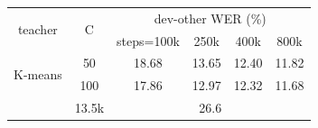 \begin{tabular}{cc|cccc}
    \toprule
    \multirow{2}{*}{teacher} & \multirow{2}{*}{C} &  
    \multicolumn{4}{c}{dev-other WER (\%)} \\
    & & steps=100k & 250k & 400k & 800k \\
    \midrule
    \multirow{2}{*}{K-means}  
    & 50  & 18.68 & 13.65 & 12.40 & 11.82 \\
    & 100 & 17.86 & 12.97 & 12.32 & 11.68 \\
    \midrule
    \cite{baevski2019effectiveness} & 13.5k & \multicolumn{4}{c}{26.6} \\
    \bottomrule
\end{tabular}